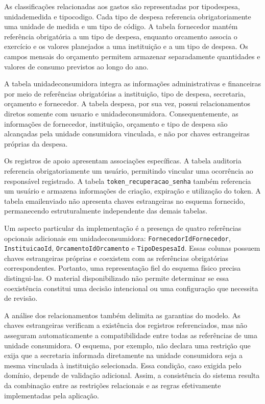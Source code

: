 As classificações relacionadas aos gastos são representadas por tipodespesa, unidademedida e tipocodigo. Cada tipo de despesa referencia obrigatoriamente uma unidade de medida e um tipo de código. A tabela fornecedor mantém referência obrigatória a um tipo de despesa, enquanto orcamento associa o exercício e os valores planejados a uma instituição e a um tipo de despesa. Os campos mensais do orçamento permitem armazenar separadamente quantidades e valores de consumo previstos ao longo do ano.

A tabela unidadeconsumidora integra as informações administrativas e financeiras por meio de referências obrigatórias a instituição, tipo de despesa, secretaria, orçamento e fornecedor. A tabela despesa, por sua vez, possui relacionamentos diretos somente com usuario e unidadeconsumidora. Consequentemente, as informações de fornecedor, instituição, orçamento e tipo de despesa são alcançadas pela unidade consumidora vinculada, e não por chaves estrangeiras próprias da despesa.

Os registros de apoio apresentam associações específicas. A tabela auditoria referencia obrigatoriamente um usuário, permitindo vincular uma ocorrência ao responsável registrado. A tabela \texttt{token\_recuperacao\_senha} também referencia um usuário e armazena informações de criação, expiração e utilização do token. A tabela emailenviado não apresenta chaves estrangeiras no esquema fornecido, permanecendo estruturalmente independente das demais tabelas.

Um aspecto particular da implementação é a presença de quatro referências opcionais adicionais em unidadeconsumidora: \texttt{FornecedorIdFornecedor}, \texttt{InstituicaoId}, \texttt{OrcamentoIdOrcamento} e \texttt{TipoDespesaId}. Essas colunas possuem chaves estrangeiras próprias e coexistem com as referências obrigatórias correspondentes. Portanto, uma representação fiel do esquema físico precisa distingui-las. O material disponibilizado não permite determinar se essa coexistência constitui uma decisão intencional ou uma configuração que necessita de revisão.

A análise dos relacionamentos também delimita as garantias do modelo. As chaves estrangeiras verificam a existência dos registros referenciados, mas não asseguram automaticamente a compatibilidade entre todas as referências de uma unidade consumidora. O esquema, por exemplo, não declara uma restrição que exija que a secretaria informada diretamente na unidade consumidora seja a mesma vinculada à instituição selecionada. Essa condição, caso exigida pelo domínio, depende de validação adicional. Assim, a consistência do sistema resulta da combinação entre as restrições relacionais e as regras efetivamente implementadas pela aplicação.

